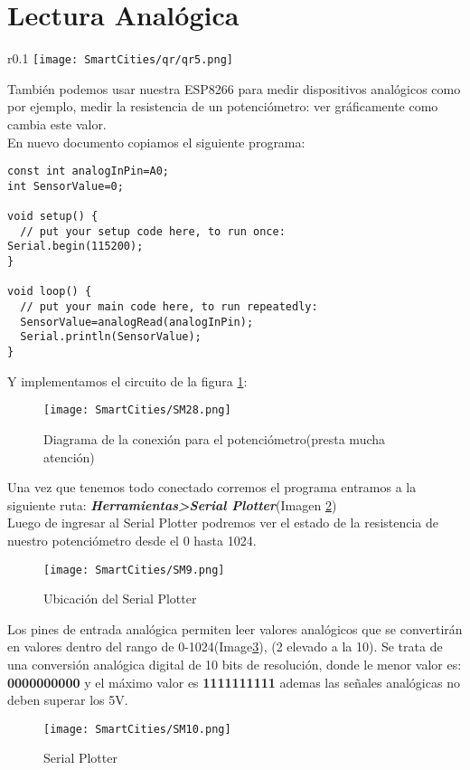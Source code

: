 \documentclass[
	12pt, %
	fleqn, %
	a4paper, %
]{LegrandOrangeBook}
\begin{document}
\section{Lectura Analógica}
\begin{wrapfigure}{r}{0.1\linewidth}
\centering\texttt{[image: SmartCities/qr/qr5.png]}
\caption{QR program: 5.GraphAnalog}
\label{fig:qr5}
\end{wrapfigure}
También podemos usar nuestra ESP8266 para medir dispositivos analógicos como por ejemplo, medir la resistencia de un potenciómetro:  ver gráficamente como cambia este valor.\\
En nuevo documento copiamos el siguiente programa:
\begin{lstlisting}[caption={Medir la resistencia de un potenciómetro},captionpos=b,frame=single]
const int analogInPin=A0;
int SensorValue=0;

void setup() {
  // put your setup code here, to run once:
Serial.begin(115200);
}

void loop() {
  // put your main code here, to run repeatedly:
  SensorValue=analogRead(analogInPin);
  Serial.println(SensorValue);
}
\end{lstlisting}
Y implementamos el circuito de la figura \ref{fig:readanalog potenciometer}:
\begin{figure}[H]
\centering\texttt{[image: SmartCities/SM28.png]}
\caption{Diagrama de la conexión para el potenciómetro(presta mucha atención)}
\label{fig:readanalog potenciometer}
\end{figure}
Una vez que tenemos todo conectado corremos el programa entramos a la siguiente ruta: \textbf{\textit{Herramientas>Serial Plotter}}(Imagen \ref{fig:UbiSerialPlotter})\\
Luego de ingresar al Serial Plotter podremos ver el estado de la resistencia de nuestro potenciómetro desde el 0 hasta 1024.\\
\begin{figure}[h]
\centering\texttt{[image: SmartCities/SM9.png]}
\caption{Ubicación del Serial Plotter}
\label{fig:UbiSerialPlotter}
\end{figure}
Los pines de entrada analógica permiten leer valores analógicos que se convertirán en valores dentro del rango de 0-1024(Image\ref{fig:SerialPlotter}), (2 elevado a la 10). Se trata de una conversión analógica digital de 10 bits de resolución, donde le menor valor es: \textbf{0000000000} y el máximo valor es \textbf{1111111111} ademas las señales analógicas no deben superar los 5V.
\begin{figure}[H]
\centering\texttt{[image: SmartCities/SM10.png]}
\caption{Serial Plotter}
\label{fig:SerialPlotter}
\end{figure}
\newpage
\end{document}
